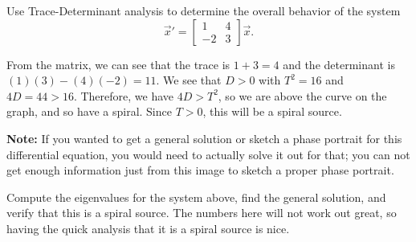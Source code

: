 \documentclass{ximera}
\begin{document}
\begin{example}
    Use Trace-Determinant analysis to determine the overall behavior of the system
    \begin{equation*}
        {\vec{x}}' = \begin{bmatrix} 1 & 4 \\ -2 & 3 \end{bmatrix}\vec{x}.
    \end{equation*}
\end{example}

\begin{exampleSol}
    From the matrix, we can see that the trace is $1 + 3  = 4$ and the determinant is $(1)(3) - (4)(-2) = 11$. We see that $D > 0$ with $T^2 = 16$ and $4D = 44 > 16$. Therefore, we have $4D > T^2$, so we are above the curve on the graph, and so have a spiral. Since $T > 0$, this will be a spiral source. 
    
    \textbf{Note:} If you wanted to get a general solution or sketch a phase portrait for this differential equation, you would need to actually solve it out for that; you can not get enough information just from this image to sketch a proper phase portrait.
\end{exampleSol}

\begin{exercise}
    Compute the eigenvalues for the system above, find the general solution, and verify that this is a spiral source. The numbers here will not work out great, so having the quick analysis that it is a spiral source is nice. 
\end{exercise} 
 
\end{document}
